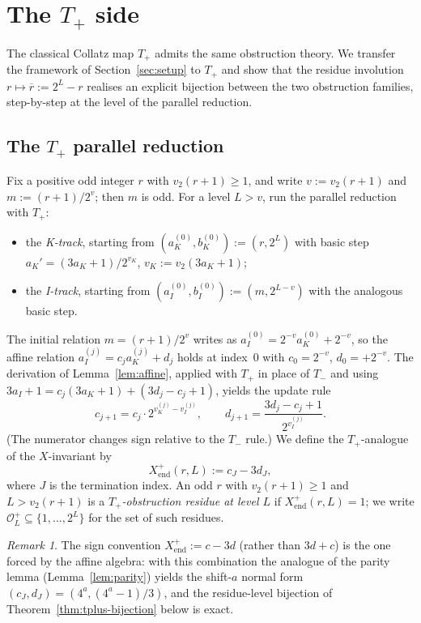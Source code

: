 \documentclass[11pt,reqno]{amsart}
\theoremstyle{plain}
\theoremstyle{definition}
\theoremstyle{remark}
\newtheorem{remark}[theorem]{Remark}
\newcommand{\Tplus}{T_{+}}
\newcommand{\Tminus}{T_{-}}
\newcommand{\Obs}{\mathcal{O}}
\newcommand{\Xend}{X_{\mathrm{end}}}
\newcommand{\vk}{v_{K}}
\newcommand{\vi}{v_{I}}
\newcommand{\vtwo}{v_{2}}
\begin{document}
\section{The \texorpdfstring{$T_+$}{T+} side}
\label{sec:tplus}

The classical Collatz map $\Tplus$ admits the same obstruction theory.
We transfer the framework of Section~\ref{sec:setup} to $\Tplus$ and
show that the residue involution $r \mapsto \overline{r} := 2^L - r$
realises an explicit bijection between the two obstruction families,
step-by-step at the level of the parallel reduction.

\subsection{The \texorpdfstring{$\Tplus$}{T+} parallel reduction}

Fix a positive odd integer $r$ with $\vtwo(r+1) \ge 1$, and write
$v := \vtwo(r+1)$ and $m := (r+1)/2^v$; then $m$ is odd. For a level
$L > v$, run the parallel reduction with $\Tplus$:
\begin{itemize}
\item the \emph{K-track}, starting from $(a_K^{(0)}, b_K^{(0)}) := (r, 2^L)$
  with basic step $a_K' = (3 a_K + 1)/2^{\vk}$,
  $\vk := \vtwo(3 a_K + 1)$;
\item the \emph{I-track}, starting from
  $(a_I^{(0)}, b_I^{(0)}) := (m, 2^{L - v})$ with the analogous basic step.
\end{itemize}
The initial relation $m = (r+1)/2^v$ writes as
$a_I^{(0)} = 2^{-v} a_K^{(0)} + 2^{-v}$, so the affine relation
$a_I^{(j)} = c_j a_K^{(j)} + d_j$ holds at index~$0$ with
$c_0 = 2^{-v}$, $d_0 = +2^{-v}$. The derivation of
Lemma~\ref{lem:affine}, applied with $\Tplus$ in place of $\Tminus$ and
using $3 a_I + 1 = c_j (3 a_K + 1) + (3 d_j - c_j + 1)$, yields the
update rule
\[
c_{j+1} = c_j \cdot 2^{\vk^{(j)} - \vi^{(j)}}, \qquad
d_{j+1} = \frac{3 d_j - c_j + 1}{2^{\vi^{(j)}}}.
\]
(The numerator changes sign relative to the $\Tminus$ rule.) We define
the $\Tplus$-analogue of the $X$-invariant by
\[
\Xend^{+}(r, L) := c_J - 3 d_J,
\]
where $J$ is the termination index. An odd $r$ with $\vtwo(r+1) \ge 1$
and $L > \vtwo(r+1)$ is a \emph{$\Tplus$-obstruction residue at level $L$}
if $\Xend^{+}(r, L) = 1$; we write $\Obs_L^{+} \subseteq \{1, \ldots, 2^L\}$
for the set of such residues.

\begin{remark}\label{rem:Xplus-sign}
The sign convention $\Xend^{+} := c - 3d$ (rather than $3d + c$) is the
one forced by the affine algebra: with this combination the analogue of
the parity lemma (Lemma~\ref{lem:parity}) yields the shift-$a$ normal
form $(c_J, d_J) = (4^a, (4^a - 1)/3)$, and the residue-level bijection
of Theorem~\ref{thm:tplus-bijection} below is exact.
\end{remark}
\end{document}
